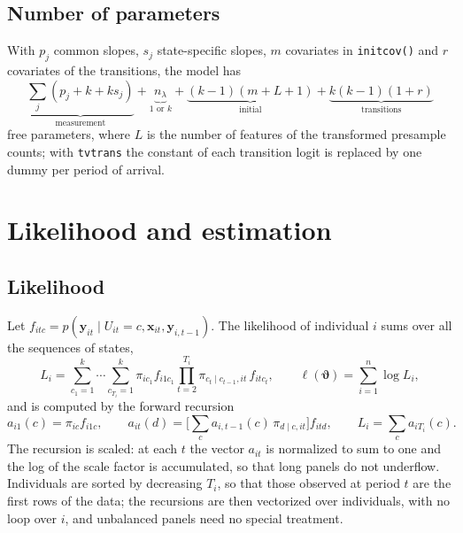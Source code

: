 \documentclass[11pt,a4paper]{article}
\newcommand{\cmd}[1]{\texttt{#1}}
\newcommand{\yv}{\mathbf y}
\newcommand{\xv}{\mathbf x}
\begin{document}
\subsection{Number of parameters}

With $p_j$ common slopes, $s_j$ state-specific slopes, $m$ covariates in \cmd{initcov()} and $r$
covariates of the transitions, the model has
\[
\underbrace{\textstyle\sum_j(p_j+k+k s_j)}_{\text{measurement}}+\underbrace{n_\lambda}_{1\text{ or }k}
+\underbrace{(k-1)(m+L+1)}_{\text{initial}}+\underbrace{k(k-1)(1+r)}_{\text{transitions}}
\]
free parameters, where $L$ is the number of features of the transformed presample counts; with \cmd{tvtrans} the constant of each transition logit is replaced by one dummy per
period of arrival.

\section{Likelihood and estimation}\label{sec:estimation}

\subsection{Likelihood}

Let $f_{itc}=p(\yv_{it}\mid U_{it}=c,\xv_{it},\yv_{i,t-1})$. The likelihood of individual $i$ sums
over all the sequences of states,
\begin{equation}
L_i=\sum_{c_1=1}^k\cdots\sum_{c_{T_i}=1}^k\pi_{ic_1}f_{i1c_1}\prod_{t=2}^{T_i}\pi_{c_t\mid c_{t-1},it}\,f_{itc_t},
\qquad \ell(\bm\vartheta)=\sum_{i=1}^n\log L_i,
\end{equation}
and is computed by the forward recursion \citep{baum1970,zucchini2016}
\begin{equation}
a_{i1}(c)=\pi_{ic}f_{i1c},\qquad
a_{it}(d)=\Big[\sum_{c}a_{i,t-1}(c)\,\pi_{d\mid c,it}\Big]f_{itd},\qquad
L_i=\sum_c a_{iT_i}(c).
\end{equation}
The recursion is scaled: at each $t$ the vector $a_{it}$ is normalized to sum to one and the log of
the scale factor is accumulated, so that long panels do not underflow. Individuals are sorted by
decreasing $T_i$, so that those observed at period $t$ are the first rows of the data; the recursions
are then vectorized over individuals, with no loop over $i$, and unbalanced panels need no special
treatment.
\end{document}
